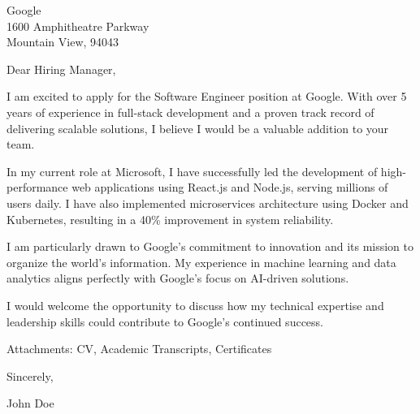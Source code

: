 \documentclass[11pt,a4paper]{letter}
\begin{document}
\begin{letter}{Google\\
1600 Amphitheatre Parkway\\
Mountain View, 94043}

\address{John Doe\\
123 Main Street\\
San Francisco, 94105\\
123-456-7890\\
johndoe@example.com}

\date{February 21, 2025}

\opening{Dear Hiring Manager,}

I am excited to apply for the Software Engineer position at Google. With over 5 years of experience in full-stack development and a proven track record of delivering scalable solutions, I believe I would be a valuable addition to your team.

In my current role at Microsoft, I have successfully led the development of high-performance web applications using React.js and Node.js, serving millions of users daily. I have also implemented microservices architecture using Docker and Kubernetes, resulting in a 40\% improvement in system reliability.

I am particularly drawn to Google's commitment to innovation and its mission to organize the world's information. My experience in machine learning and data analytics aligns perfectly with Google's focus on AI-driven solutions.

I would welcome the opportunity to discuss how my technical expertise and leadership skills could contribute to Google's continued success.

\vspace{\baselineskip}
\noindent
\vspace{\baselineskip}\noindent Attachments: CV, Academic Transcripts, Certificates

\closing{Sincerely,}

\vspace{0.5in}
John Doe

\end{letter}
\end{document}
